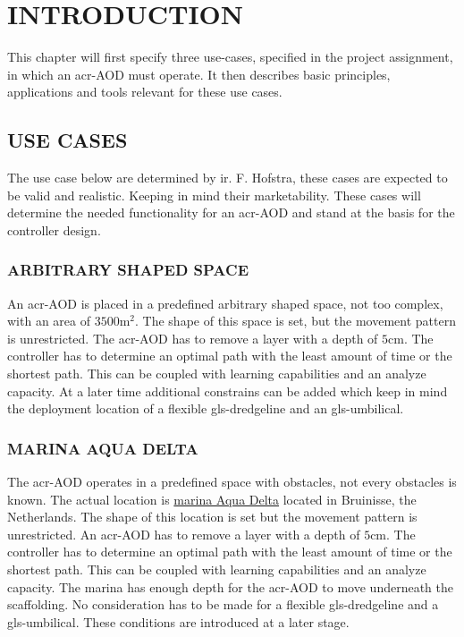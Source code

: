 \chapter{INTRODUCTION}\label{chap:introduction}


 This chapter will first specify three use-cases, specified in the project assignment, in which an \gls{acr-AOD} must operate. It then describes basic principles, applications and tools relevant for these use cases.

\section{USE CASES}\label{sec:usecases}
The use case below are determined by ir. F. Hofstra, these cases are expected to be valid and realistic. Keeping in mind their marketability. These cases will determine the needed functionality for an \gls{acr-AOD} and stand at the basis for the controller design.

\subsection{ARBITRARY SHAPED SPACE}\label{sec:usecase1}
An \gls{acr-AOD} is placed in a predefined arbitrary shaped space, not too complex, with an area of \( 3500 \si{\square\metre} \). The shape of this space is set, but the movement pattern is unrestricted. The \gls{acr-AOD} has to remove a layer with a depth of \( 5 \si{\cm} \). The controller has to determine an optimal path with the least amount of time or the shortest path. This can be coupled with learning capabilities and an analyze capacity. At a later time additional constrains can be added which keep in mind the deployment location of a flexible \gls{gls-dredgeline} and an \gls{gls-umbilical}.

\subsection{MARINA AQUA DELTA}\label{sec:usecase2}
The \gls{acr-AOD} operates in a predefined space with obstacles, not every obstacles is known. The actual location is \href{https://www.google.nl/maps/place/Jachthaven+Bruinisse/@51.6712838,4.0824101,15z/data=!4m2!3m1!1s0x0:0x9c840ab80bde39c8}{marina Aqua Delta} located in Bruinisse, the Netherlands. The shape of this location is set but the movement pattern is unrestricted. An \gls{acr-AOD}  has to remove a layer with a depth of \( 5 \si{\cm} \). The controller has to determine an optimal path with the least amount of time or the shortest path. This can be coupled with learning capabilities and an analyze capacity. The marina has enough depth for the \gls{acr-AOD} to move underneath the scaffolding.
No consideration has to be made for a flexible \gls{gls-dredgeline} and a \gls{gls-umbilical}. These conditions are introduced at a later stage.

